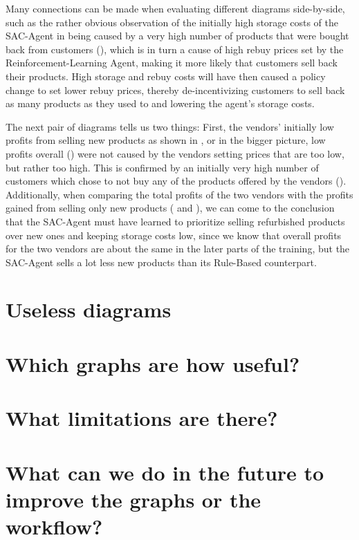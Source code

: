 Many connections can be made when evaluating different diagrams side-by-side, such as the rather obvious observation of the initially high storage costs of the SAC-Agent in  being caused by a very high number of products that were bought back from customers (), which is in turn a cause of high rebuy prices set by the Reinforcement-Learning Agent, making it more likely that customers sell back their products. High storage and rebuy costs will have then caused a policy change to set lower rebuy prices, thereby de-incentivizing customers to sell back as many products as they used to and lowering the agent's storage costs.

The next pair of diagrams tells us two things: First, the vendors' initially low profits from selling new products as shown in , or in the bigger picture, low profits overall () were not caused by the vendors setting prices that are too low, but rather too high. This is confirmed by an initially very high number of customers which chose to not buy any of the products offered by the vendors (). Additionally, when comparing the total profits of the two vendors with the profits gained from selling only new products ( and ), we can come to the conclusion that the SAC-Agent must have learned to prioritize selling refurbished products over new ones and keeping storage costs low, since we know that overall profits for the two vendors are about the same in the later parts of the training, but the SAC-Agent sells a lot less new products than its Rule-Based counterpart.

\section*{Useless diagrams}\label{sec:UselessDiagrams}
\section*{Which graphs are how useful?}
\section*{What limitations are there?}
\section*{What can we do in the future to improve the graphs or the workflow?}

